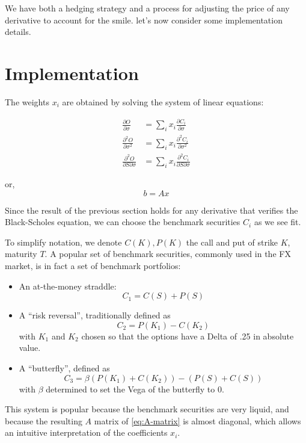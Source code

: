 \documentclass[]{tufte-book}
\begin{document}
We have both a hedging strategy and a process for adjusting the price of
any derivative to account for the smile. let's now consider some
implementation details.

\hypertarget{implementation}{%
\section{Implementation}\label{implementation}}

The weights \(x_i\) are obtained by solving the system of linear
equations:

\begin{align}
 \frac{\partial O}{\partial \sigma} &= \sum_i x_i \frac{\partial C_i}{\partial \sigma} \\
\frac{\partial^2 O}{\partial \sigma^2} &= \sum_i x_i \frac{\partial^2 C_i}{\partial \sigma^2} \\
\frac{\partial^2 O}{\partial S \partial \sigma} &= \sum_i x_i \frac{\partial^2 C_i}{\partial S \partial \sigma}
\end{align}

or,
\begin{equation}
b = Ax
\label{eq:A-matrix}
\end{equation}

Since the result of the previous section holds for any derivative that
verifies the Black-Scholes equation, we can choose the benchmark
securities \(C_i\) as we see fit.

To simplify notation, we denote \(C(K), P(K)\) the call
and put of strike \(K\), maturity \(T\).
A popular set of benchmark securities, commonly used in the FX market, is
in fact a set of benchmark portfolios:

\begin{itemize}
\item
  An at-the-money straddle: \[C_1 = C(S) + P(S)\]
\item
  A ``risk reversal'', traditionally defined as
  \[C_2 = P(K_1) - C(K_2)\] with \(K_1\) and \(K_2\) chosen so that the
  options have a Delta of .25 in absolute value.
\item
  A ``butterfly'', defined as
  \[C_3 = \beta ( P(K_1) + C(K_2) ) -(P(S)+C(S))\] with \(\beta\)
  determined to set the Vega of the butterfly to 0.
\end{itemize}

This system is popular because the benchmark securities are very liquid,
and because the resulting \(A\) matrix of \eqref{eq:A-matrix} is almost
diagonal, which allows an intuitive interpretation of the coefficients
\(x_i\).
\end{document}
